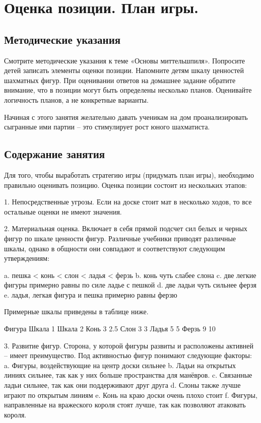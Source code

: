 \chapter{Оценка позиции. План игры.}

\section{Методические указания}

Смотрите методические указания к теме «Основы миттельшпиля». Попросите детей записать элементы оценки позиции. Напомните детям шкалу ценностей шахматных фигур. При оценивании ответов на домашнее задание обратите внимание, что в позиции могут быть определены несколько планов. Оценивайте логичность планов, а не конкретные варианты.

Начиная с этого занятия желательно давать ученикам на дом проанализировать сыгранные ими партии – это стимулирует рост юного шахматиста.

\section{Содержание занятия}

Для того, чтобы выработать стратегию игры (придумать план игры), необходимо правильно оценивать позицию. Оценка позиции состоит из нескольких этапов:

1.	Непосредственные угрозы. Если на доске стоит мат в несколько ходов, то все остальные оценки не имеют значения.

2.	Материальная оценка. Включает в себя прямой подсчет сил белых и черных фигур по шкале ценности фигур. Различные учебники приводят различные шкалы, однако в общности они совпадают и соответствуют следующим утверждениям: 

a.	пешка < конь < слон < ладья < ферзь
b.	конь чуть слабее слона
c.	две легкие фигуры примерно равны по силе ладье с пешкой
d.	две ладьи чуть сильнее ферзя
e.	ладья, легкая фигура и пешка примерно равны ферзю

Примерные шкалы приведены в таблице ниже.

Фигура	Шкала 1	Шкала 2
Конь 	3	2.5
Слон	3	3
Ладья	5	5
Ферзь	9	10

3.	Развитие фигур. Сторона, у которой фигуры развиты и расположены активней – имеет преимущество. Под активностью фигур понимают следующие факторы:
a.	Фигуры, воздействующие на центр доски сильнее
b.	Ладьи на открытых линиях сильнее, так как у них больше пространства для манёвров.
c.	Связанные ладьи сильнее, так как они поддерживают друг друга
d.	Слоны также лучше играют по открытым линиям
e.	Конь на краю доски очень плохо стоит
f.	Фигуры, направленные на вражеского короля стоят лучше, так как позволяют атаковать короля.

